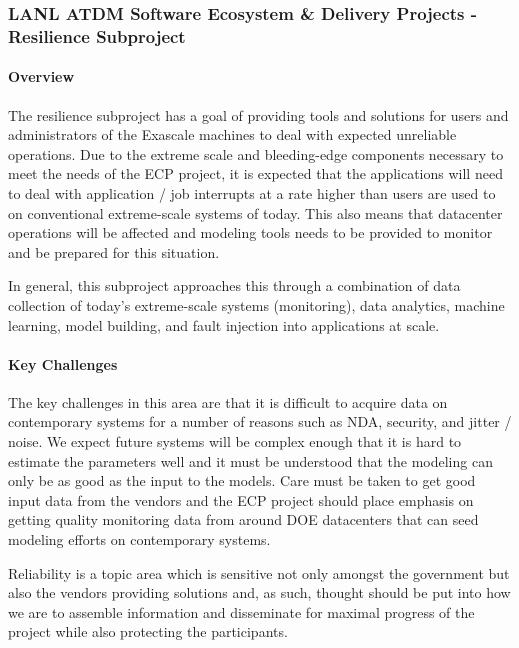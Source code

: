 \subsubsection{ LANL ATDM Software Ecosystem \& Delivery Projects - Resilience Subproject} 

\paragraph{Overview}
The resilience subproject has a goal of providing tools and solutions for
users and administrators of the Exascale machines to deal with expected
unreliable operations.  Due to the extreme scale and bleeding-edge components
necessary to meet the needs of the ECP project, it is expected that the
applications will need to deal with application / job interrupts at a rate
higher than users are used to on conventional extreme-scale systems of today.
This also means that datacenter operations will be affected and modeling tools
needs to be provided to monitor and be prepared for this situation.

In general, this subproject approaches this through a combination of data
collection of today's extreme-scale systems (monitoring), data analytics,
machine learning, model building, and fault injection into applications at
scale.

\paragraph{Key Challenges}
The key challenges in this area are that it is difficult to acquire data on
contemporary systems for a number of reasons such as NDA, security, and 
jitter / noise.  We expect future systems will be complex enough that it is
hard to estimate the parameters well and it must be understood that the
modeling can only be as good as the input to the models.  Care must be taken to
get good input data from the vendors and the ECP project should place emphasis
on getting quality monitoring data from around DOE datacenters that can seed
modeling efforts on contemporary systems.

Reliability is a topic area which is sensitive not only amongst the government
but also the vendors providing solutions and, as such, thought should be put
into how we are to assemble information and disseminate for maximal progress of
the project while also protecting the participants.

